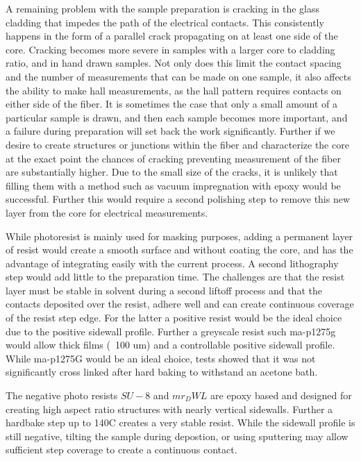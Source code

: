 A remaining problem with the sample preparation is cracking in the glass cladding that impedes the path of the electrical contacts. This consistently happens in the form of a parallel crack propagating on at least one side of the core. Cracking becomes more severe in samples with a larger core to cladding ratio, and in hand drawn samples. Not only does this limit the contact spacing and the number of measurements that can be made on one sample, it also affects the ability to make hall measurements, as the hall pattern requires contacts on either side of the fiber. It is sometimes the case that only a small amount of a particular sample is drawn, and then each sample becomes more important, and a failure during preparation will set back the work significantly. Further if we desire to create structures or junctions within the fiber and characterize the core at the exact point the chances of cracking preventing measurement of the fiber are substantially higher. Due to the small size of the cracks, it is unlikely that filling them with a method such as vacuum impregnation with epoxy would be successful. Further this would require a second polishing step to remove this new layer from the core for electrical measurements.

While photoresist is mainly used for masking purposes, adding a permanent layer of resist would create a smooth surface and without coating the core, and has the advantage of integrating easily with the current process. A second lithography step would add little to the preparation time. The challenges are that the resist layer must be stable in solvent during a second liftoff process and that the contacts deposited over the resist, adhere well and can create continuous coverage of the resist step edge. For the latter a positive resist would be the ideal choice due to the positive sidewall profile. Further a greyscale resist such ma-p1275g  would allow thick films (~100 um) and a controllable positive sidewall profile. While ma-p1275G would be an ideal choice, tests showed that it was not significantly cross linked after hard baking to withstand an acetone bath. 

The negative photo resists $SU-8$ and $mr_DWL$ are epoxy based and designed for creating high aspect ratio structures with nearly vertical sidewalls. Further a hardbake step up to 140C creates a very stable resist. While the sidewall profile is still negative, tilting the sample during depostion, or using sputtering may allow sufficient step coverage to create a continuous contact. 

